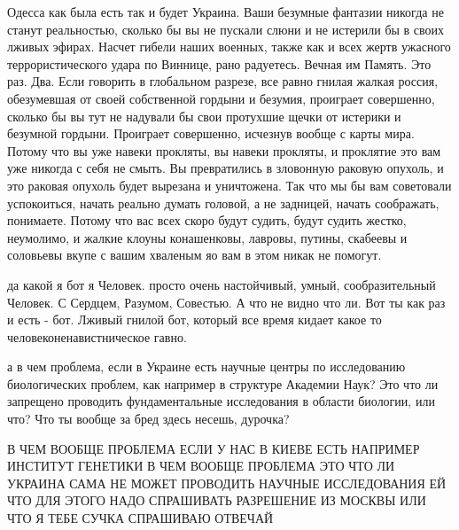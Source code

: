 Одесса как была есть так и будет Украина. Ваши безумные фантазии никогда не
станут реальностью, сколько бы вы не пускали слюни и не истерили бы в своих
лживых эфирах. Насчет гибели наших военных, также как и всех жертв ужасного
террористического удара по Виннице, рано радуетесь. Вечная им Память. Это раз.
Два. Если говорить в глобальном разрезе, все равно гнилая жалкая россия,
обезумевшая от своей собственной гордыни и безумия, проиграет совершенно,
сколько бы вы тут не надували бы свои протухшие щечки от истерики и безумной
гордыни. Проиграет совершенно, исчезнув вообще с карты мира.  Потому что вы уже
навеки прокляты, вы навеки прокляты, и проклятие это вам уже никогда с себя не
смыть. Вы превратились в зловонную раковую опухоль, и это раковая опухоль будет
вырезана и уничтожена. Так что мы бы вам советовали успокоиться, начать реально
думать головой, а не задницей, начать соображать, понимаете. Потому что вас
всех скоро будут судить, будут судить жестко, неумолимо, и жалкие клоуны
конашенковы, лавровы, путины, скабеевы и соловьевы вкупе с вашим хваленым яо
вам в этом никак не помогут.

да какой я бот я Человек. просто очень настойчивый, умный, сообразительный
Человек. С Сердцем, Разумом, Совестью. А что не видно что ли. Вот ты как раз и
есть - бот. Лживый гнилой бот, который все время кидает какое то
человеконенавистническое гавно.

а в чем проблема, если в Украине есть научные центры по исследованию
биологических проблем, как например в структуре Академии Наук? Это что ли
запрещено проводить фундаментальные исследования в области биологии, или что?
Что ты вообще за бред здесь несешь, дурочка?

В ЧЕМ ВООБЩЕ ПРОБЛЕМА ЕСЛИ У НАС В КИЕВЕ ЕСТЬ НАПРИМЕР ИНСТИТУТ ГЕНЕТИКИ В ЧЕМ
ВООБЩЕ ПРОБЛЕМА ЭТО ЧТО ЛИ УКРАИНА САМА НЕ МОЖЕТ ПРОВОДИТЬ НАУЧНЫЕ ИССЛЕДОВАНИЯ
ЕЙ ЧТО ДЛЯ ЭТОГО НАДО СПРАШИВАТЬ РАЗРЕШЕНИЕ ИЗ МОСКВЫ ИЛИ ЧТО Я ТЕБЕ СУЧКА
СПРАШИВАЮ ОТВЕЧАЙ
